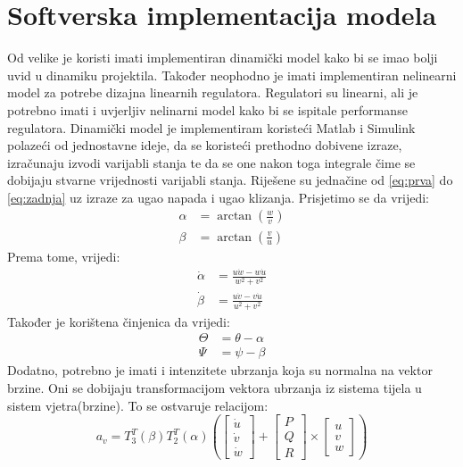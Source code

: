 \section{Softverska implementacija modela}
Od velike je koristi imati implementiran dinamički model kako bi se imao bolji 
uvid u dinamiku projektila. Također neophodno je imati implementiran 
nelinearni model za potrebe dizajna linearnih regulatora. Regulatori su linearni, ali 
je potrebno imati i uvjerljiv nelinarni model kako bi se ispitale performanse regulatora.
Dinamički model je implementiram koristeći Matlab i Simulink polazeći od jednostavne ideje,
da se koristeći prethodno dobivene izraze, izračunaju izvodi varijabli stanja te da se one 
nakon toga integrale čime se dobijaju stvarne vrijednosti varijabli stanja. Riješene su jednačine 
od \ref{eq:prva} do \ref{eq:zadnja} uz izraze za ugao napada i ugao klizanja. 
Prisjetimo se da vrijedi:
\begin{align*}
    \alpha &= \arctan(\frac{w}{v})\\
    \beta &= \arctan(\frac{v}{u})
\end{align*}
Prema tome, vrijedi:
\begin{align}
    \dot{\alpha} &= \frac{u\dot{w} - w\dot{u}}{w^2+v^2}\\
    \dot{\beta} &= \frac{u\dot{v} - v\dot{u}}{u^2+v^2}
\end{align}
Također je korištena činjenica da vrijedi:
\begin{align}
    \Theta &= \theta - \alpha\\
     \Psi &= \psi - \beta
\end{align}
Dodatno, potrebno je imati i intenzitete ubrzanja koja su normalna na vektor brzine. 
Oni se dobijaju transformacijom vektora ubrzanja iz sistema tijela u sistem vjetra(brzine). 
To se ostvaruje relacijom:
\begin{equation}
    a_v = T_3^T(\beta)T_2^T(\alpha)\left( \begin{bmatrix}
        \dot{u} \\ \dot{v} \\ \dot{w}
    \end{bmatrix} + \begin{bmatrix}
        P \\ Q \\ R
    \end{bmatrix}\times \begin{bmatrix}
        u\\v\\w
    \end{bmatrix}\right)
\end{equation}
